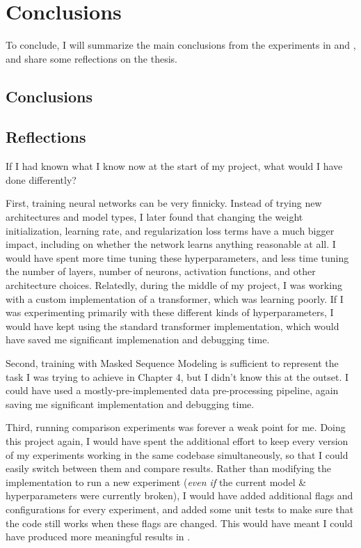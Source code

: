 \chapter{Conclusions}
\label{C:conclusion}

To conclude, I will summarize the main conclusions from the experiments in  and , and share some reflections on the thesis.

\section{Conclusions}


\section{Reflections}

If I had known what I know now at the start of my project, what would I have done differently?

First, training neural networks can be very finnicky. Instead of trying new architectures and model types, I later found that changing the weight initialization, learning rate, and regularization loss terms have a much bigger impact, including on whether the network learns anything reasonable at all. I would have spent more time tuning these hyperparameters, and less time tuning the number of layers, number of neurons, activation functions, and other architecture choices. Relatedly, during the middle of my project, I was working with a custom implementation of a transformer, which was learning poorly. If I was experimenting primarily with these different kinds of hyperparameters, I would have kept using the standard transformer implementation, which would have saved me significant implemenation and debugging time.

Second, training with Masked Sequence Modeling is sufficient to represent the task I was trying to achieve in Chapter 4, but I didn't know this at the outset. I could have used a mostly-pre-implemented data pre-processing pipeline, again saving me significant implementation and debugging time.

Third, running comparison experiments was forever a weak point for me. Doing this project again, I would have spent the additional effort to keep every version of my experiments working in the same codebase simultaneously, so that I could easily switch between them and compare results. Rather than modifying the implementation to run a new experiment (\textit{even if} the current model & hyperparameters were currently broken), I would have added additional flags and configurations for every experiment, and added some unit tests to make sure that the code still works when these flags are changed.  This would have meant I could have produced more meaningful results in .

